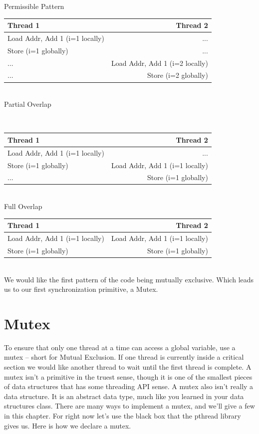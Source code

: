 Permissible Pattern
\\
\begin{center}
\begin{tabular}{ l | r }
  Thread 1 & Thread 2 \\ \hline
  Load Addr, Add 1 (i=1 locally) & ...  \\
  Store (i=1 globally) & ...  \\
  ... & Load Addr, Add 1 (i=2 locally)  \\
  ... & Store (i=2 globally)  \\
\end{tabular}
\end{center}
\\
Partial Overlap

\\
\begin{center}
\begin{tabular}{ l | r }
Thread 1 & Thread 2 \\ \hline
Load Addr, Add 1 (i=1 locally) & ... \\
Store (i=1 globally) & Load Addr, Add 1 (i=1 locally) \\
... & Store (i=1 globally) \\
\end{tabular}
\end{center}
\\

Full Overlap
\\
\begin{center}
\begin{tabular}{ l | r }
Thread 1 & Thread 2 \\ \hline
Load Addr, Add 1 (i=1 locally) & Load Addr, Add 1 (i=1 locally) \\
Store (i=1 globally) & Store (i=1 globally) \\
\end{tabular}
\end{center}
\\
We would like the first pattern of the code being mutually exclusive.
Which leads us to our first synchronization primitive, a Mutex.

\section{Mutex}

To ensure that only one thread at a time can access a global variable, use a mutex -- short for Mutual Exclusion.
If one thread is currently inside a critical section we would like another thread to wait until the first thread is complete.
A mutex isn't a primitive in the truest sense, though it is one of the smallest pieces of data structures that has some threading API sense.
A mutex also isn't really a data structure.
It is an abstract data type, much like you learned in your data structures class.
There are many ways to implement a mutex, and we'll give a few in this chapter.
For right now let's use the black box that the pthread library gives us.
Here is how we declare a mutex.

